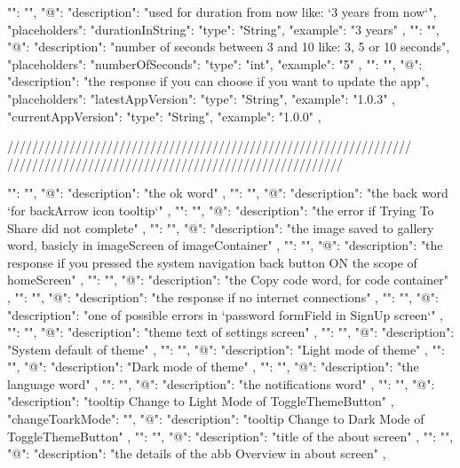 

"": "",
  "@": {
    "description": "used for duration from now like: `3 years from now`",
    "placeholders": {
      "durationInString": {
        "type": "String",
        "example": "3 years"
      }
    }
  },
"": "",
  "@": {
    "description": "number of seconds between 3 and 10 like: 3, 5 or 10 seconds",
    "placeholders": {
      "numberOfSeconds": {
        "type": "int",
        "example": "5"
      }
    }
  },
"": "",
  "@": {
    "description": "the response if you can choose if you want to update the app",
    "placeholders": {
      "latestAppVersion": {
        "type": "String",
        "example": "1.0.3"
      },
      "currentAppVersion": {
        "type": "String",
        "example": "1.0.0"
      }
    }
  },

/////////////////////////////////////////////////////////////////
//////////////////////////////////////////////////////

"": "",
  "@": {
    "description": "the ok word"
  },
  "": "",
  "@": {
    "description": "the back word `for backArrow icon tooltip`"
  },
"": "",
  "@": {
    "description": "the error if Trying To Share did not complete"
  },
"": "",
  "@": {
    "description": "the image saved to gallery word, basicly in imageScreen of imageContainer"
  },
"": "",
  "@": {
    "description": "the response if you pressed the system navigation back button ON the scope of homeScreen"
  },
"": "",
  "@": {
    "description": "the Copy code word, for code container"
  },
"": "",
  "@": {
    "description": "the response if no internet connections"
  },
"": "",
  "@": {
    "description": "one of possible errors in `password formField in SignUp screen`"
  },
"": "",
  "@": {
  "description": "theme text of settings screen"
  },
  "": "",
  "@": {
    "description": "System default of theme"
  },
  "": "",
  "@": {
    "description": "Light mode of theme"
  },
  "": "",
  "@": {
    "description": "Dark mode of theme"
  },
  "": "",
  "@": {
    "description": "the language word"
  },
  "": "",
  "@": {
    "description": "the notifications word"
  },
"": "",
  "@": {
    "description": "tooltip Change to Light Mode of ToggleThemeButton"
  },
  "changeToarkMode": "",
  "@": {
    "description": "tooltip Change to Dark Mode of ToggleThemeButton"
  },
"": "",
  "@": {
    "description": "title of the about screen"
  },
  "": "",
  "@": {
    "description": "the details of the abb Overview in about screen"
  },